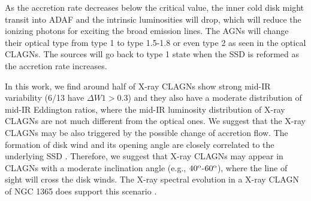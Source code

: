 \documentclass[linenumbers]{aastex631}
\begin{document}
As the accretion rate decreases below the critical value, the inner cold disk might transit into ADAF and the intrinsic luminosities will drop, which will reduce the ionizing photons for exciting the broad emission lines. The AGNs will change their optical type from type 1 to type 1.5-1.8 or even type 2 as seen in the optical CLAGNs. The sources will go back to type 1 state when the SSD is reformed as the accretion rate increases. 

In this work, we find around half of X-ray CLAGNs show strong mid-IR variability {\color{red}(6/13 have $\Delta W1>0.3$)} and they also have a moderate distribution of mid-IR Eddington ratios, where the {\color{red}mid-IR luminosity distribution} of X-ray CLAGNs are not much different from the optical ones. We suggest that the X-ray CLAGNs may be also triggered by the possible change of accretion flow. The formation of disk wind and its opening angle are closely correlated to the underlying SSD \citep[e.g.,][]{2017PASA...34...42Y,2020MNRAS.492.5540M}. Therefore, we suggest that X-ray CLAGNs may appear in CLAGNs with a moderate inclination angle (e.g., $40^{\rm o}$-$60^{\rm o}$), where the line of sight will cross the disk winds. The X-ray spectral evolution in a X-ray CLAGN of NGC 1365 does support this scenario \citep[e.g.,][]{2014MNRAS.440.3503C,2021RAA....21..199L}. 


\end{document}
